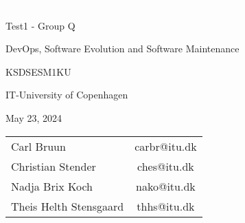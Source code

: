 \begin{center}
\thispagestyle{empty}

\textcolor{white}{.}
\vspace{1.5cm}


{\Huge
Test1 - Group Q
}

\vspace{1.5cm}

{\Large
DevOps, Software Evolution and Software Maintenance
}

KSDSESM1KU
\vspace{1cm}

IT-University of Copenhagen

May 23, 2024

\vspace{9cm}

{\Large
\begin{tabular}{l c}
   Carl Bruun  & carbr@itu.dk \\
   Christian Stender  & ches@itu.dk \\
   Nadja Brix Koch & nako@itu.dk \\
   Theis Helth Stensgaard & thhs@itu.dk
\end{tabular}
}

\end{center}
